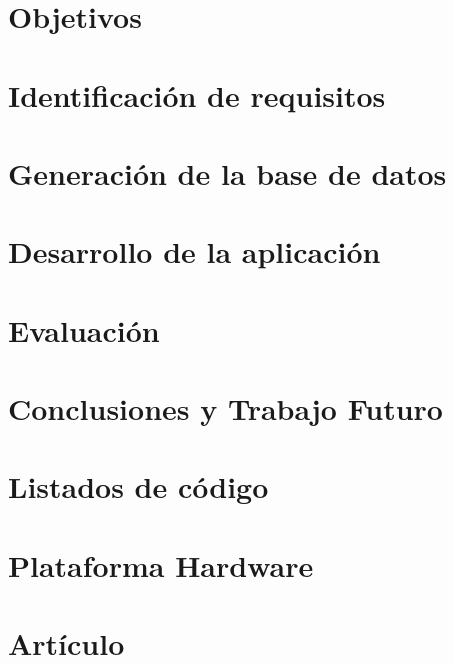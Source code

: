 \documentclass[11pt,a4paper,spanish]{book}
\begin{document}
\chapter{Objetivos}\label{chap:objetivos}


\chapter{Identificación de requisitos}\label{chap:requisitos}


\chapter{Generación de la base de datos}\label{chap:generar:dataset}


\chapter{Desarrollo de la aplicación}\label{chap:desarrollo:algoritmo}
 

\chapter{Evaluación}\label{chap:eval}


\chapter{Conclusiones y Trabajo Futuro}\label{chap:conclusiones}



% 
% 
\newpage %


\lstlistoflistings

\appendix

% 

\chapter{Listados de código}\label{app:codigo}


\chapter{Plataforma Hardware}\label{app:plataforma}


\chapter{Artículo}

\end{document}

